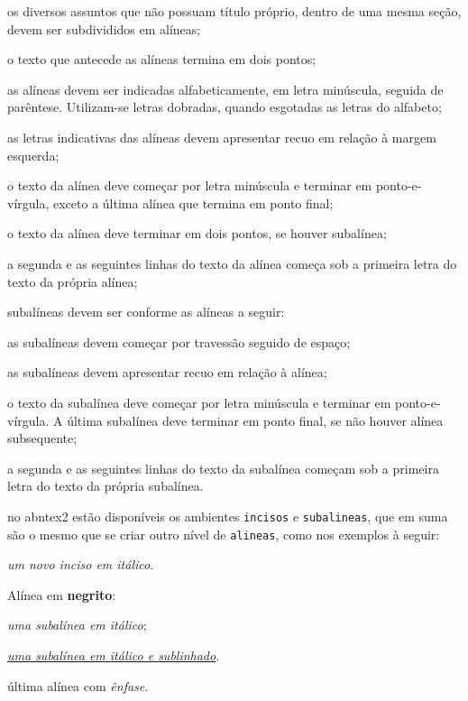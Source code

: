 \begin{alineas}%
\item os diversos assuntos que não possuam título próprio, dentro de uma mesma seção, devem ser subdivididos em alíneas;
\item o texto que antecede as alíneas termina em dois pontos;
\item as alíneas devem ser indicadas alfabeticamente, em letra minúscula, seguida de parêntese. Utilizam-se letras dobradas, quando esgotadas as letras do alfabeto;
\item as letras indicativas das alíneas devem apresentar recuo em relação à margem esquerda;
\item o texto da alínea deve começar por letra minúscula e terminar em ponto-e-vírgula, exceto a última alínea que termina em ponto final;
\item o texto da alínea deve terminar em dois pontos, se houver subalínea;
\item a segunda e as seguintes linhas do texto da alínea começa sob a primeira letra do texto da própria alínea;
\item subalíneas \cite[subseção~4.3]{NBR6024:2012} devem ser conforme as alíneas a seguir:
\begin{alineas}%
\item as subalíneas devem começar por travessão seguido de espaço;
\item as subalíneas devem apresentar recuo em relação à alínea;
\item o texto da subalínea deve começar por letra minúscula e terminar em ponto-e-vírgula. A última subalínea deve terminar em ponto final, se não houver alínea subsequente;
\item a segunda e as seguintes linhas do texto da subalínea começam sob a primeira letra do texto da própria subalínea.
\end{alineas}
\item no \gls{abntex2} estão disponíveis os ambientes \texttt{incisos} e \texttt{subalineas}, que em suma são o mesmo que se criar outro nível de \texttt{alineas}, como nos exemplos à seguir:
\begin{incisos}%
\item \textit{um novo inciso em itálico}.
\end{incisos}
\item Alínea em \textbf{negrito}:
\begin{subalineas}%
\item \textit{uma subalínea em itálico};
\item \underline{\textit{uma subalínea em itálico e sublinhado}}.
\end{subalineas}
\item última alínea com \emph{ênfase}.
\end{alineas}

